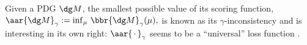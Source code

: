 Given a PDG $\dg M$, the smallest possible value of its scoring function,
$
    \aar{\dg M}_\gamma := \inf_{\mu}\, \bbr{\dg M}_\gamma(\mu),
$
is known as its $\gamma$-inconsistency
and is interesting in its own right:
$\aar{\,\cdot\,}_\gamma$ 
seems to be a ``universal'' loss
function \parencite{one-true-loss}.

